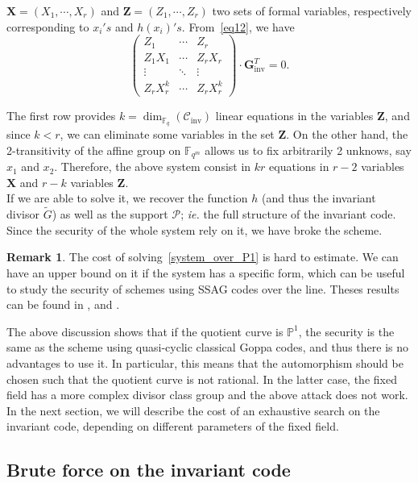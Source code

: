\documentclass[10pt]{article}
\theoremstyle{definition}
\newtheorem{rq1}[thm]{Remark}
\theoremstyle{definition}
\theoremstyle{definition}
\newcommand{\cd}{\cdot}
\newcommand{\PP}{\mathbb{P}}
\newcommand{\fqm}{\mathbb{F}_{q^m}}
\newcommand{\fq}{\mathbb{F}_q}
\newcommand{\PR}{\mathcal{P}}
\begin{document}
$\mathbf{X} = (X_1,\cdots,X_r)$ and $\mathbf{Z} = (Z_1,\cdots,Z_r)$ two sets of formal variables, respectively corresponding to $x_i's$ and $h(x_i)'s$. From~\eqref{eq12}, we have
\begin{equation} \label{system_over_P1}
\begin{pmatrix}
Z_1 & \cdots & Z_r \\
Z_1X_1 & \cdots & Z_{r}X_{r} \\
\vdots & \ddots & \vdots \\
Z_rX_r^{k} & \cdots & Z_{r}X_{r}^k 
\end{pmatrix}
\cd \mathbf{G}_{\mathrm{inv}}^T= 0.
\end{equation}

\noindent The first row provides $k=\dim_{\fq}(\mathcal{C}_{\mathrm{inv}})$ linear equations in the variables $\mathbf{Z}$, and since $k < r$, we can eliminate some variables in the set $\mathbf{Z}$. On the other hand, the 2-transitivity of the affine group on $\fqm$ allows us to fix arbitrarily 2 unknows, say $x_1$ and $x_2$. Therefore, the above system consist in $kr$ equations in $r-2$ variables $\mathbf{X}$ and $r-k$ variables $\mathbf{Z}$. \\
If we are able to solve it, we recover the function $h$ (and thus the invariant divisor $\tilde{G}$) as well as the support $\PR$; \textit{ie.} the full structure of the invariant code. Since the security of the whole system rely on it, we have broke the scheme.  

\begin{rq1} 
The cost of solving~\eqref{system_over_P1} is hard to estimate. We can have an upper bound on it if the system has a specific form, which can be useful to study the security of schemes using SSAG codes over the line. Theses results can be found in \cite{FOP}, \cite{FOP1} and \cite{FOP2}. 
\end{rq1}

The above discussion shows that if the quotient curve is $\PP^1$, the security is the same as the scheme using quasi-cyclic classical Goppa codes, and thus there is no advantages to use it. In particular, this means that the automorphism should be chosen such that the quotient curve is not rational. In the latter case, the fixed field has a more complex divisor class group and the above attack does not work. In the next section, we will describe the cost of an exhaustive search on the invariant code, depending on different parameters of the fixed field. 


\subsection{Brute force on the invariant code} \label{bruteforce}
\end{document}
